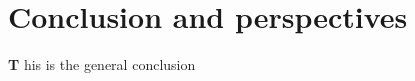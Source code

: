 \chapter*{Conclusion and perspectives}
\label{conclusion}
\lettrine[findent=2pt]{\textbf{T}}{ }his is the general conclusion